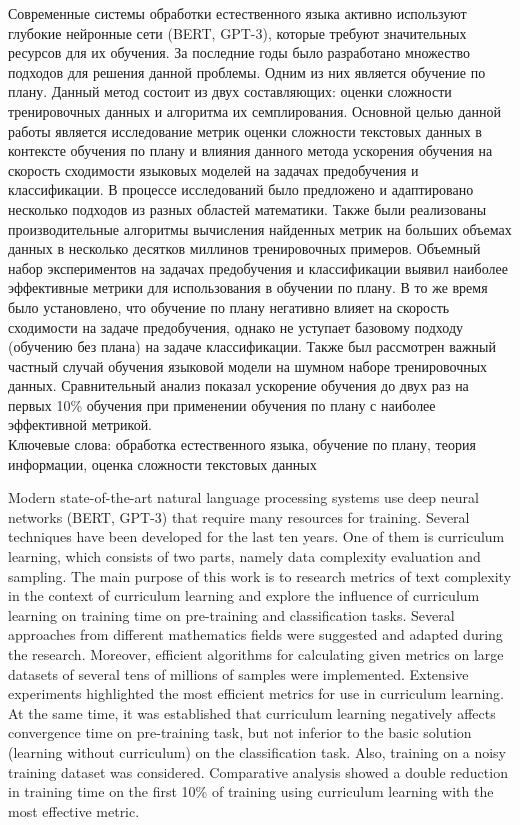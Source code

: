 \documentclass{spbau-diploma}
\begin{document}
Современные системы обработки естественного языка активно используют глубокие нейронные сети (BERT, GPT-3), которые требуют значительных ресурсов для их обучения. За последние годы было разработано множество подходов для решения данной проблемы. Одним из них является обучение по плану. Данный метод состоит из двух составляющих: оценки сложности тренировочных данных и алгоритма их семплирования. Основной целью данной работы является исследование метрик оценки сложности текстовых данных в контексте обучения по плану и влияния данного метода ускорения обучения на скорость сходимости языковых моделей на задачах предобучения и классификации. В процессе исследований было предложено и адаптировано несколько подходов из разных областей математики. Также были реализованы производительные алгоритмы вычисления найденных метрик на больших объемах данных в несколько десятков миллинов тренировочных примеров. Объемный набор экспериментов на задачах предобучения и классификации  выявил наиболее эффективные метрики для использования в обучении по плану. В то же время было установлено, что обучение по плану негативно влияет на скорость сходимости на задаче предобучения, однако не уступает базовому подходу (обучению без плана) на задаче классификации. Также был рассмотрен важный частный случай обучения языковой модели на шумном наборе тренировочных данных. Сравнительный анализ показал ускорение обучения до двух раз на первых 10\% обучения при применении обучения по плану с наиболее эффективной метрикой.
\\

Ключевые слова: обработка естественного языка, обучение по плану, теория информации, оценка сложности текстовых данных

\pagebreak

Modern state-of-the-art natural language processing systems use deep neural networks (BERT, GPT-3) that require many resources for training. Several techniques have been developed for the last ten years. One of them is curriculum learning, which consists of two parts, namely data complexity evaluation and sampling. The main purpose of this work is to research metrics of text complexity in the context of curriculum learning and explore the influence of curriculum learning on training time on pre-training and classification tasks. Several approaches from different mathematics fields were suggested and adapted during the research. Moreover, efficient algorithms for calculating given metrics on large datasets of several tens of millions of samples were implemented. Extensive experiments highlighted the most efficient metrics for use in curriculum learning. At the same time, it was established that curriculum learning negatively affects convergence time on pre-training task, but not inferior to the basic solution (learning without curriculum) on the classification task. Also, training on a noisy training dataset was considered. Comparative analysis showed a double reduction in training time on the first 10\% of training using curriculum learning with the most effective metric.
\end{document}
